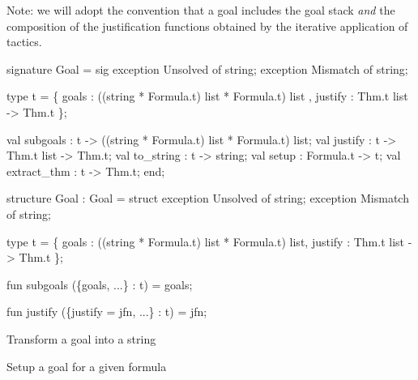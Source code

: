 \begin{node}
Note: we will adopt the convention that a goal includes the goal stack
\emph{and} the composition of the justification functions obtained by
the iterative application of tactics.
\end{node}

\nwenddocs{}\endmoddef\nwstartdeflinemarkup\nwenddeflinemarkup
signature Goal = sig
  exception Unsolved of string;
  exception Mismatch of string;
  
  type t = \{ goals : ((string * Formula.t) list * Formula.t) list
           , justify : Thm.t list -> Thm.t \};

  val subgoals : t -> ((string * Formula.t) list * Formula.t) list;
  val justify : t -> Thm.t list -> Thm.t;
  val to_string : t -> string;
  val setup : Formula.t -> t;
  val extract_thm : t -> Thm.t;
end;
\nwendcode{}\nwdocspar

\nwenddocs{}\endmoddef\nwstartdeflinemarkup\nwenddeflinemarkup
structure Goal : Goal = struct
exception Unsolved of string;
exception Mismatch of string;

type t = \{ goals : ((string * Formula.t) list * Formula.t) list,
           justify : Thm.t list -> Thm.t \};

fun subgoals (\{goals, ...\} : t) = goals;

fun justify (\{justify = jfn, ...\} : t) = jfn;

\LA{}Transform a goal into a string~{\nwtagstyle{}}\RA{}

\LA{}Setup a goal for a given formula~{\nwtagstyle{}}\RA{}

